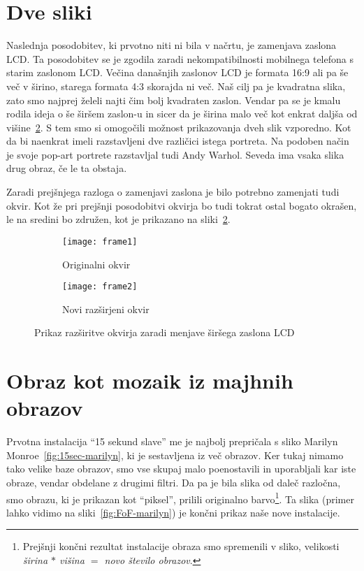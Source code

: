 \section{Dve sliki}
Naslednja posodobitev, ki prvotno niti ni bila v načrtu, je zamenjava zaslona
LCD. Ta posodobitev se je zgodila zaradi nekompatibilnosti mobilnega telefona
s starim zaslonom LCD. Večina današnjih zaslonov LCD je formata 16:9 ali pa še
več v širino, starega formata 4:3 skorajda ni več. Naš cilj pa je kvadratna
slika, zato smo najprej želeli najti čim bolj kvadraten zaslon. Vendar pa se
je kmalu rodila ideja o še širšem zaslon-u in sicer da je širina malo več kot
enkrat daljša od višine~\ref{fig:frame2}. S tem smo si omogočili možnost
prikazovanja dveh slik vzporedno. Kot da bi naenkrat imeli razstavljeni dve
različici istega portreta. Na podoben način je svoje pop-art portrete
razstavljal tudi Andy Warhol. Seveda ima vsaka slika drug obraz, če le ta
obstaja.

Zaradi prejšnjega razloga o zamenjavi zaslona je bilo potrebno zamenjati tudi
okvir. Kot že pri prejšnji posodobitvi okvirja bo tudi tokrat ostal bogato
okrašen, le na sredini bo združen, kot je prikazano na sliki~\ref{fig:frame2}.

\begin{figure}[!ht]
    \centering
    \begin{subfigure}[b]{0.33\textwidth}
        \texttt{[image: frame1]}
        \caption{Originalni okvir}
    \end{subfigure}
    \begin{subfigure}[b]{0.6\textwidth}
        \texttt{[image: frame2]}
        \caption{Novi razširjeni okvir}
        \label{fig:frame2}
    \end{subfigure}
    \caption{Prikaz razširitve okvirja zaradi menjave širšega zaslona LCD}
\end{figure}


\section{Obraz kot mozaik iz majhnih obrazov}
Prvotna instalacija ``15 sekund slave'' me je najbolj prepričala s sliko
Marilyn Monroe~\ref{fig:15sec-marilyn}, ki je sestavljena iz več obrazov. Ker
tukaj nimamo tako velike baze obrazov, smo vse skupaj malo poenostavili in
uporabljali kar iste obraze, vendar obdelane z drugimi filtri. Da pa je bila
slika od daleč razločna, smo obrazu, ki je prikazan kot ``piksel'', prilili
originalno barvo\footnote{Prejšnji končni rezultat instalacije obraza smo
spremenili v sliko, velikosti \textit{širina $*$ višina $=$ novo število
obrazov}.}. Ta slika (primer lahko vidimo na sliki~\ref{fig:FoF-marilyn}) je
končni prikaz naše nove instalacije.

